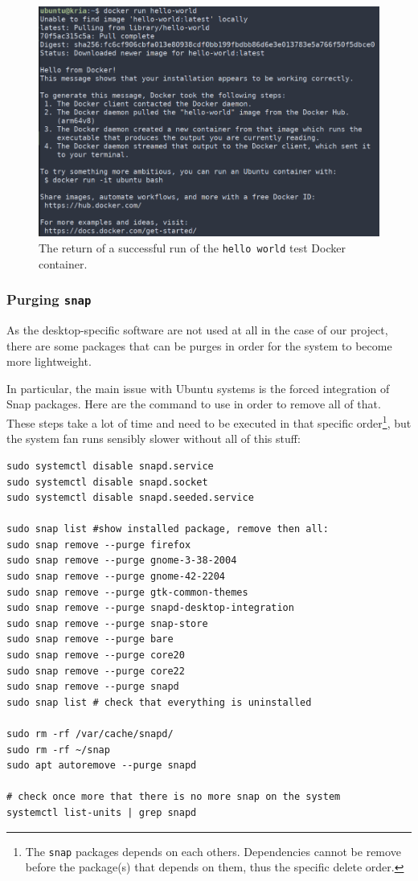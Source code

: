 \documentclass[10pt]{article}
\begin{document}
\begin{figure}[htbp]
\centering
\includegraphics[width=.7\textwidth]{img/hello-docker.png}
\caption{\label{fig:org8ea7320}The return of a successful run of the \texttt{hello world} test Docker container.}
\end{figure}

\subsubsection{Purging \texttt{snap}}
\label{sec:org1e4097a}
As the desktop-specific software are not used at all in the case
of our project, there are some packages that can be purges in order for the
system to become more lightweight.

In particular, the main issue with Ubuntu systems is the forced integration of
Snap packages. Here are the command to use in order to remove all of that.
These steps take a lot of time and need to be executed in that specific order\footnote{The \texttt{snap} packages depends on each others. Dependencies
cannot be remove before the package(s) that depends on them,
thus the specific delete order.},
but the system fan runs sensibly slower without all of this stuff:

\begin{verbatim}
sudo systemctl disable snapd.service
sudo systemctl disable snapd.socket
sudo systemctl disable snapd.seeded.service

sudo snap list #show installed package, remove then all:
sudo snap remove --purge firefox
sudo snap remove --purge gnome-3-38-2004
sudo snap remove --purge gnome-42-2204
sudo snap remove --purge gtk-common-themes
sudo snap remove --purge snapd-desktop-integration
sudo snap remove --purge snap-store
sudo snap remove --purge bare
sudo snap remove --purge core20
sudo snap remove --purge core22
sudo snap remove --purge snapd
sudo snap list # check that everything is uninstalled

sudo rm -rf /var/cache/snapd/
sudo rm -rf ~/snap
sudo apt autoremove --purge snapd

# check once more that there is no more snap on the system
systemctl list-units | grep snapd 
\end{verbatim}
\end{document}
